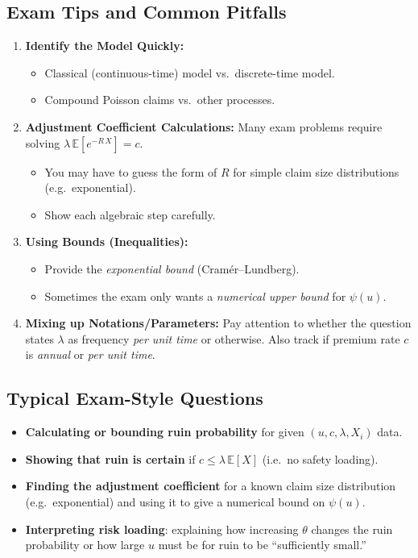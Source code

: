 \documentclass[13pt,a4paper]{article}
\begin{document}
\subsection{Exam Tips and Common Pitfalls}
\begin{enumerate}
  \item \textbf{Identify the Model Quickly:} 
    \begin{itemize}
      \item Classical (continuous-time) model vs.\ discrete-time model.
      \item Compound Poisson claims vs.\ other processes.
    \end{itemize}
  \item \textbf{Adjustment Coefficient Calculations:} Many exam problems require solving 
    \(\lambda\, \mathbb{E}[e^{-R\,X}] = c\). 
    \begin{itemize}
      \item You may have to guess the form of \(R\) for simple claim size distributions (e.g.\ exponential).
      \item Show each algebraic step carefully.
    \end{itemize}
  \item \textbf{Using Bounds (Inequalities):} 
    \begin{itemize}
      \item Provide the \emph{exponential bound} (Cram\'er--Lundberg).
      \item Sometimes the exam only wants a \emph{numerical upper bound} for \(\psi(u)\).
    \end{itemize}
  \item \textbf{Mixing up Notations/Parameters:} Pay attention to whether the question states \(\lambda\) as frequency \emph{per unit time} or otherwise. Also track if premium rate \(c\) is \emph{annual} or \emph{per unit time}.
\end{enumerate}

\subsection{Typical Exam-Style Questions}
\begin{itemize}
  \item \textbf{Calculating or bounding ruin probability} for given \((u, c, \lambda, X_i)\) data. 
  \item \textbf{Showing that ruin is certain} if \(c \le \lambda\,\mathbb{E}[X]\) (i.e.\ no safety loading).
  \item \textbf{Finding the adjustment coefficient} for a known claim size distribution (e.g.\ exponential) and using it to give a numerical bound on \(\psi(u)\).
  \item \textbf{Interpreting risk loading}: explaining how increasing \(\theta\) changes the ruin probability or how large \(u\) must be for ruin to be “sufficiently small.”
\end{itemize}
\end{document}
